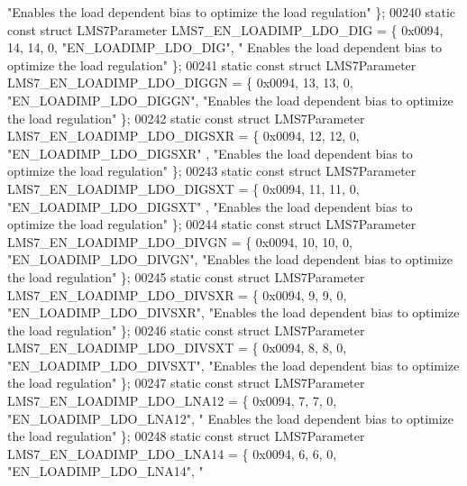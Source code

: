 \begin{DoxyCode}
{      "Enables the load dependent bias to optimize the load regulation"} \};
00240 \textcolor{keyword}{static} \textcolor{keyword}{const} \textcolor{keyword}{struct }LMS7Parameter LMS7_EN_LOADIMP_LDO_DIG = \{ 0x0094, 14, 14, 0, \textcolor{stringliteral}{"EN\_LOADIMP\_LDO\_DIG"}, \textcolor{stringliteral}{"
      Enables the load dependent bias to optimize the load regulation"} \};
00241 \textcolor{keyword}{static} \textcolor{keyword}{const} \textcolor{keyword}{struct }LMS7Parameter LMS7_EN_LOADIMP_LDO_DIGGN = \{ 0x0094, 13, 13, 0, \textcolor{stringliteral}{"EN\_LOADIMP\_LDO\_DIGGN"}, \textcolor{stringliteral}{
      "Enables the load dependent bias to optimize the load regulation"} \};
00242 \textcolor{keyword}{static} \textcolor{keyword}{const} \textcolor{keyword}{struct }LMS7Parameter LMS7_EN_LOADIMP_LDO_DIGSXR = \{ 0x0094, 12, 12, 0, \textcolor{stringliteral}{"EN\_LOADIMP\_LDO\_DIGSXR"}
      , \textcolor{stringliteral}{"Enables the load dependent bias to optimize the load regulation"} \};
00243 \textcolor{keyword}{static} \textcolor{keyword}{const} \textcolor{keyword}{struct }LMS7Parameter LMS7_EN_LOADIMP_LDO_DIGSXT = \{ 0x0094, 11, 11, 0, \textcolor{stringliteral}{"EN\_LOADIMP\_LDO\_DIGSXT"}
      , \textcolor{stringliteral}{"Enables the load dependent bias to optimize the load regulation"} \};
00244 \textcolor{keyword}{static} \textcolor{keyword}{const} \textcolor{keyword}{struct }LMS7Parameter LMS7_EN_LOADIMP_LDO_DIVGN = \{ 0x0094, 10, 10, 0, \textcolor{stringliteral}{"EN\_LOADIMP\_LDO\_DIVGN"}, \textcolor{stringliteral}{
      "Enables the load dependent bias to optimize the load regulation"} \};
00245 \textcolor{keyword}{static} \textcolor{keyword}{const} \textcolor{keyword}{struct }LMS7Parameter LMS7_EN_LOADIMP_LDO_DIVSXR = \{ 0x0094, 9, 9, 0, \textcolor{stringliteral}{"EN\_LOADIMP\_LDO\_DIVSXR"}, \textcolor{stringliteral}{
      "Enables the load dependent bias to optimize the load regulation"} \};
00246 \textcolor{keyword}{static} \textcolor{keyword}{const} \textcolor{keyword}{struct }LMS7Parameter LMS7_EN_LOADIMP_LDO_DIVSXT = \{ 0x0094, 8, 8, 0, \textcolor{stringliteral}{"EN\_LOADIMP\_LDO\_DIVSXT"}, \textcolor{stringliteral}{
      "Enables the load dependent bias to optimize the load regulation"} \};
00247 \textcolor{keyword}{static} \textcolor{keyword}{const} \textcolor{keyword}{struct }LMS7Parameter LMS7_EN_LOADIMP_LDO_LNA12 = \{ 0x0094, 7, 7, 0, \textcolor{stringliteral}{"EN\_LOADIMP\_LDO\_LNA12"}, \textcolor{stringliteral}{"
      Enables the load dependent bias to optimize the load regulation"} \};
00248 \textcolor{keyword}{static} \textcolor{keyword}{const} \textcolor{keyword}{struct }LMS7Parameter LMS7_EN_LOADIMP_LDO_LNA14 = \{ 0x0094, 6, 6, 0, \textcolor{stringliteral}{"EN\_LOADIMP\_LDO\_LNA14"}, \textcolor{stringliteral}{"
}
\end{DoxyCode}

